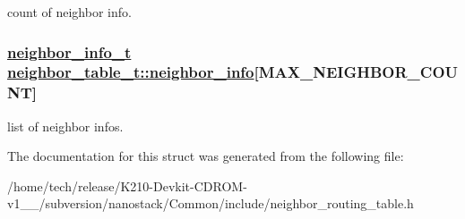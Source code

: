 count of neighbor info. \hypertarget{structneighbor__table__t_e30e42768188549dd78db7e22b26e702}{
\subsubsection[neighbor\_\-info]{\setlength{\rightskip}{0pt plus 5cm}\hyperlink{structneighbor__info__t}{neighbor\_\-info\_\-t} \hyperlink{structneighbor__table__t_e30e42768188549dd78db7e22b26e702}{neighbor\_\-table\_\-t::neighbor\_\-info}\mbox{[}MAX\_\-NEIGHBOR\_\-COUNT\mbox{]}}}
\label{structneighbor__table__t_e30e42768188549dd78db7e22b26e702}


list of neighbor infos. 

The documentation for this struct was generated from the following file:\begin{CompactItemize}
\item 
/home/tech/release/K210-Devkit-CDROM-v1\_\_/subversion/nanostack/Common/include/neighbor\_\-routing\_\-table.h\end{CompactItemize}
